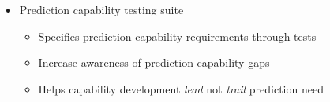 \begin{frame}
\begin{center}
\begin{itemize}
\begin{itemize}
      \end{itemize}
\item Prediction capability testing suite
      \begin{itemize}
      \item Specifies prediction capability requirements through tests
      \item Increase awareness of prediction capability gaps
      \item Helps capability development \textit{lead} not \textit{trail} prediction need
      \end{itemize}
\end{itemize}
\end{center}
\end{frame}

